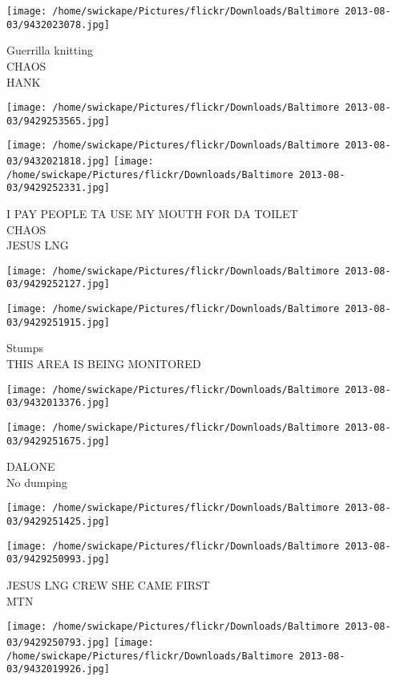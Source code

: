 \documentclass[10pt,letterpaper]{article}
\begin{document}
\texttt{[image: /home/swickape/Pictures/flickr/Downloads/Baltimore 2013-08-03/9432023078.jpg]}

Guerrilla knitting\\
CHAOS\\
HANK
\pagebreak

\texttt{[image: /home/swickape/Pictures/flickr/Downloads/Baltimore 2013-08-03/9429253565.jpg]}

\vspace{0.25in}
\texttt{[image: /home/swickape/Pictures/flickr/Downloads/Baltimore 2013-08-03/9432021818.jpg]}
\texttt{[image: /home/swickape/Pictures/flickr/Downloads/Baltimore 2013-08-03/9429252331.jpg]}

I PAY PEOPLE TA USE MY MOUTH FOR DA TOILET\\
CHAOS\\
JESUS LNG
\pagebreak

\texttt{[image: /home/swickape/Pictures/flickr/Downloads/Baltimore 2013-08-03/9429252127.jpg]}

\vspace{0.25in}
\texttt{[image: /home/swickape/Pictures/flickr/Downloads/Baltimore 2013-08-03/9429251915.jpg]}

Stumps\\
THIS AREA IS BEING MONITORED
\pagebreak

\texttt{[image: /home/swickape/Pictures/flickr/Downloads/Baltimore 2013-08-03/9432013376.jpg]}

\vspace{0.25in}
\texttt{[image: /home/swickape/Pictures/flickr/Downloads/Baltimore 2013-08-03/9429251675.jpg]}

DALONE\\
No dumping
\pagebreak

\texttt{[image: /home/swickape/Pictures/flickr/Downloads/Baltimore 2013-08-03/9429251425.jpg]}

\vspace{0.25in}
\texttt{[image: /home/swickape/Pictures/flickr/Downloads/Baltimore 2013-08-03/9429250993.jpg]}

JESUS LNG CREW SHE CAME FIRST\\
MTN
\pagebreak

\texttt{[image: /home/swickape/Pictures/flickr/Downloads/Baltimore 2013-08-03/9429250793.jpg]}
\texttt{[image: /home/swickape/Pictures/flickr/Downloads/Baltimore 2013-08-03/9432019926.jpg]}
\end{document}

